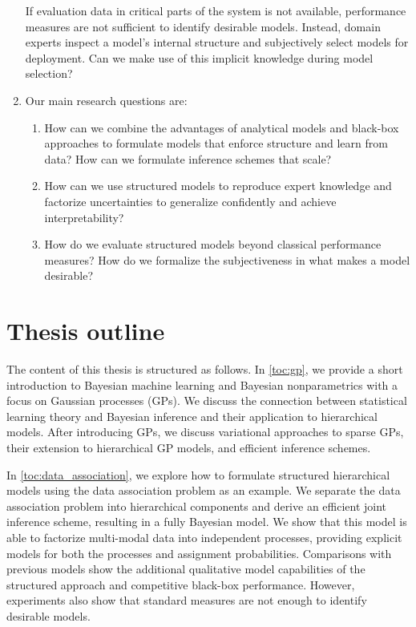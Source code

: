 \begin{enumerate}
    If evaluation data in critical parts of the system is not available, performance measures are not sufficient to identify desirable models.
    Instead, domain experts inspect a model's internal structure and subjectively select models for deployment.
    Can we make use of this implicit knowledge during model selection?
    \item Our main research questions are:
        \begin{enumerate}
            \item How can we combine the advantages of analytical models and black-box approaches to formulate models that enforce structure and learn from data?
            How can we formulate inference schemes that scale?
            \item How can we use structured models to reproduce expert knowledge and factorize uncertainties to generalize confidently and achieve interpretability?
            \item How do we evaluate structured models beyond classical performance measures?
            How do we formalize the subjectiveness in what makes a model desirable?
        \end{enumerate}
\end{enumerate}


\section{Thesis outline}
The content of this thesis is structured as follows.
In \cref{toc:gp}, we provide a short introduction to Bayesian machine learning and Bayesian nonparametrics with a focus on Gaussian processes (GPs).
We discuss the connection between statistical learning theory and Bayesian inference and their application to hierarchical models.
After introducing GPs, we discuss variational approaches to sparse GPs, their extension to hierarchical GP models, and efficient inference schemes.

In \cref{toc:data_association}, we explore how to formulate structured hierarchical models using the data association problem as an example.
We separate the data association problem into hierarchical components and derive an efficient joint inference scheme, resulting in a fully Bayesian model.
We show that this model is able to factorize multi-modal data into independent processes, providing explicit models for both the processes and assignment probabilities.
Comparisons with previous models show the additional qualitative model capabilities of the structured approach and competitive black-box performance.
However, experiments also show that standard measures are not enough to identify desirable models.

